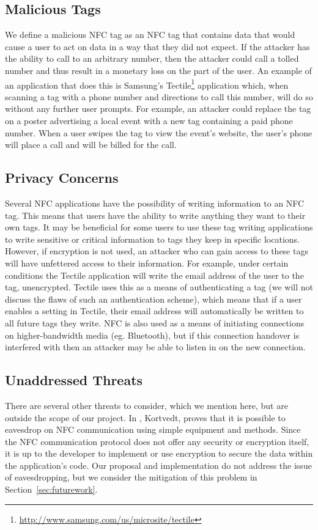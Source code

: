\documentclass[12pt]{article}
\begin{document}
\subsection{Malicious Tags}
We define a malicious NFC tag as an NFC tag that contains data that would cause a user to act on data in a way that they did not expect.
If the attacker has the ability to call to an arbitrary number, then the attacker could call a tolled number and thus result in a monetary loss on the part of the user. 
An example of an application that does this is Samsung's Tectile\footnote{\url{http://www.samsung.com/us/microsite/tectile}} application which, when scanning a tag with a phone number and directions to call this number, will do so without any further user prompts.
For example, an attacker could replace the tag on a poster advertising a local event with a new tag containing a paid phone number.
When a user swipes the tag to view the event's website, the user's phone will place a call and will be billed for the call.

\subsection{Privacy Concerns}
\label{sec:threatmodel:privacy}
Several NFC applications have the possibility of writing information to an NFC tag.
This means that users have the ability to write anything they want to their own tags.
It may be beneficial for some users to use these tag writing applications to write sensitive or critical information to tags they keep in specific locations.
However, if encryption is not used, an attacker who can gain access to these tags will have unfettered access to their information.
For example, under certain conditions the Tectile application will write the email address of the user to the tag, unencrypted.
Tectile uses this as a means of authenticating a tag (we will not discuss the flaws of such an authentication scheme), which means that if a user enables a setting in Tectile, their email address will automatically be written to all future tags they write.
NFC is also used as a means of initiating connections on higher-bandwidth media (eg. Bluetooth), but if this connection handover is interfered with then an attacker may be able to listen in on the new connection.

\subsection{Unaddressed Threats}
There are several other threats to consider, which we mention here, but are outside the scope of our project.
In \cite{kortvedt2009}, Kortvedt, proves that it is possible to eavesdrop on NFC communication using simple equipment and methods.
Since the NFC communication protocol does not offer any security or encryption itself, it is up to the developer to implement or use encryption to secure the data within the application's code. 
Our proposal and implementation do not address the issue of eavesdropping, but we consider the mitigation of this problem in Section~\ref{sec:futurework}.
\end{document}
